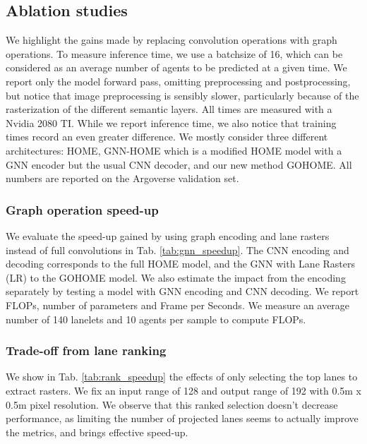 \documentclass[letterpaper, 10 pt, conference]{ieeeconf}
\begin{document}
\subsection{Ablation studies}
\label{sec:ablation_studies}

We highlight the gains made by replacing convolution operations with graph operations. To measure inference time, we use a batchsize of 16, which can be considered as an average number of agents to be predicted at a given time. We report only the model forward pass, omitting preprocessing and postprocessing, but notice that image preprocessing is sensibly slower, particularly because of the rasterization of the different semantic layers. All times are measured with a Nvidia 2080 TI. While we report inference time, we also notice that training times record an even greater difference. We mostly consider three different architectures: HOME, GNN-HOME which is a modified HOME model with a GNN encoder but the usual CNN decoder, and our new method GOHOME. All numbers are reported on the Argoverse validation set.



\subsubsection{Graph operation speed-up}

We evaluate the speed-up gained by using graph encoding and lane rasters instead of full convolutions in Tab. \ref{tab:gnn_speedup}. The CNN encoding and decoding corresponds to the full HOME model, and the GNN with Lane Rasters (LR) to the GOHOME model. We also estimate the impact from the encoding separately by testing a model with GNN encoding and CNN decoding. We report FLOPs, number of parameters and Frame per Seconds. We measure an average number of 140 lanelets and 10 agents per sample to compute FLOPs.







\subsubsection{Trade-off from lane ranking}
\label{sec:abl_ranking}

We show in Tab. \ref{tab:rank_speedup} the effects of only selecting the top  lanes to extract rasters. We fix an input range of 128 and output range of 192 with 0.5m x 0.5m pixel resolution. We observe that this ranked selection doesn't decrease performance, as limiting the number of projected lanes seems to actually improve the metrics, and brings effective speed-up. 
\end{document}
